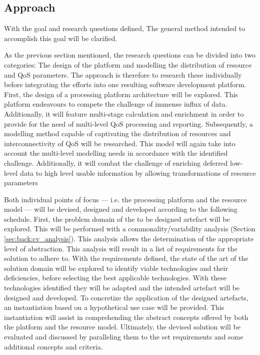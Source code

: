 \subsection{Approach}
With the goal and research questions defined, The general method intended to accomplish this goal will be clarified.

As the previous section mentioned, the research questions can be divided into two categories: The design of the platform and modelling the distribution of resource and QoS parameters. The approach is therefore to research these individually before integrating the efforts into one resulting software development platform. First, the design of a processing platform architecture will be explored. This platform endeavours to compete the challenge of immense influx of data. Additionally, it will feature multi-stage calculation and enrichment in order to provide for the need of multi-level QoS processing and reporting. Subsequently, a modelling method capable of captivating the distribution of resources and interconnectivity of QoS will be researched. This model will again take into account the multi-level modelling needs in accordance with the identified challenge. Additionally, it will combat the challenge of enriching deferred low-level data to high level usable information by allowing transformations of resource parameters

Both individual points of focus --- i.e. the processing platform and the resource model --- will be devised, designed and developed according to the following schedule. First, the problem domain of the to be designed artefact will be explored. This will be performed with a commonality/variability analysis (Section \ref{sec:back:cv_analysis}). This analysis allows the determination of the appropriate level of abstraction. This analysis will result in a list of requirements for the solution to adhere to. With the requirements defined, the state of the art of the solution domain will be explored to identify viable technologies and their deficiencies, before selecting the best applicable technologies. With these technologies identified they will be adapted and the intended artefact will be designed and developed. To concretize the application of the designed artefacts, an instantiation based on a hypothetical use case will be provided. This instantiation will assist in comprehending the abstract concepts offered by both the platform and the resource model. Ultimately, the devised solution will be evaluated and discussed by paralleling them to the set requirements and some additional concepts and criteria.

